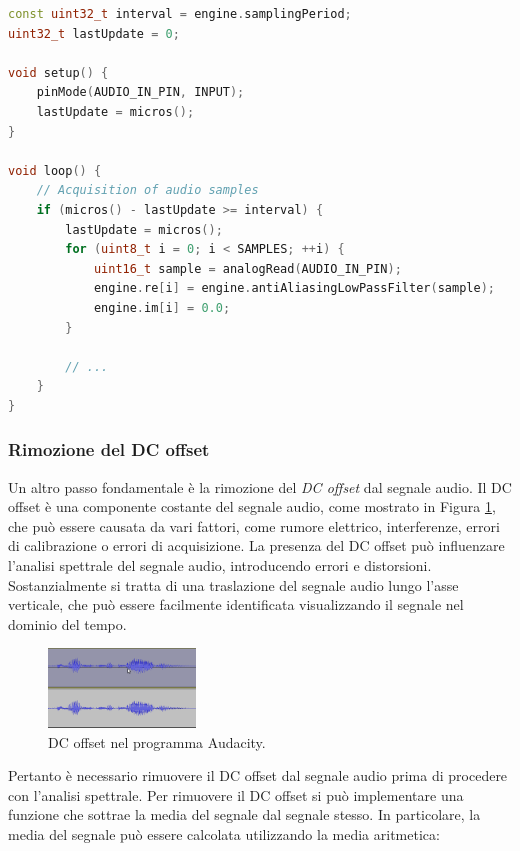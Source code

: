 \documentclass[a4paper,12pt]{report}  %
\begin{document}
\begin{lstlisting}[language=C++,keywords={antiAliasingLowPassFilter, const, uint8_t, if, for, void, Serial, begin, uint16_t, analogRead, println, uint32_t, micros, pinMode, INPUT}]
const uint32_t interval = engine.samplingPeriod;
uint32_t lastUpdate = 0;

void setup() {
    pinMode(AUDIO_IN_PIN, INPUT);
    lastUpdate = micros();
}

void loop() {
    // Acquisition of audio samples
    if (micros() - lastUpdate >= interval) {
        lastUpdate = micros();
        for (uint8_t i = 0; i < SAMPLES; ++i) {
            uint16_t sample = analogRead(AUDIO_IN_PIN);
            engine.re[i] = engine.antiAliasingLowPassFilter(sample);
            engine.im[i] = 0.0;
        }
     
        // ...
    }
}
\end{lstlisting}

\subsubsection{Rimozione del DC offset}\label{sec:dc_offset}
Un altro passo fondamentale è la rimozione del \textit{DC offset} dal segnale audio.
Il DC offset è una componente costante del segnale audio, come mostrato in Figura \ref{fig:dc_offset}, che può essere causata da vari fattori, come rumore elettrico, interferenze, errori di calibrazione o errori di acquisizione.
La presenza del DC offset può influenzare l'analisi spettrale del segnale audio, introducendo errori e distorsioni.
Sostanzialmente si tratta di una traslazione del segnale audio lungo l'asse verticale, che può essere facilmente identificata visualizzando il segnale nel dominio del tempo.

\begin{figure}[h]
    \centering
    \includegraphics[width=0.35\textwidth]{imgs/dc_offset-audacity.png}
    \caption{DC offset nel programma Audacity.}
    \label{fig:dc_offset}
\end{figure}

Pertanto è necessario rimuovere il DC offset dal segnale audio prima di procedere con l'analisi spettrale.
Per rimuovere il DC offset si può implementare una funzione che sottrae la media del segnale dal segnale stesso.
In particolare, la media del segnale può essere calcolata utilizzando la media aritmetica:
\end{document}
